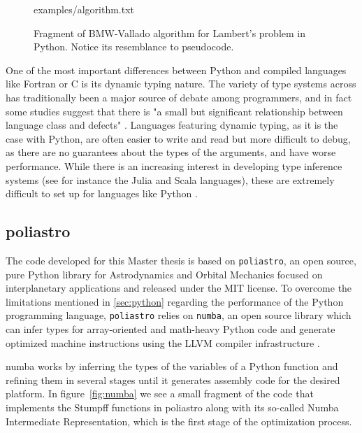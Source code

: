 \begin{figure}
\begin{lstinputlisting}[language=Python]{examples/algorithm.txt}
\end{lstinputlisting}
\caption{Fragment of BMW-Vallado algorithm for Lambert's problem in Python. Notice its resemblance to pseudocode.}
\label{fig:python}
\end{figure}

One of the most important differences between Python and compiled languages like Fortran or C is its dynamic typing nature. The variety of type systems across has traditionally been a major source of debate among programmers, and in fact some studies suggest that there is "a small but significant relationship between language class and defects" \cite{ray2014quality}. Languages featuring dynamic typing, as it is the case with Python, are often easier to write and read but more difficult to debug, as there are no guarantees about the types of the arguments, and have worse performance. While there is an increasing interest in developing type inference systems (see for instance the Julia and Scala languages), these are extremely difficult to set up for languages like Python \cite{cannon2005localized}.

\subsection{poliastro}

The code developed for this Master thesis is based on \verb|poliastro|, an open source, pure Python library for Astrodynamics and Orbital Mechanics focused on interplanetary applications and released under the MIT license\cite{cano2017poliastro060}. To overcome the limitations mentioned in \ref{sec:python} regarding the performance of the Python programming language, \verb|poliastro| relies on \verb|numba|, an open source library which can infer types for array-oriented and math-heavy Python code and generate optimized machine instructions using the LLVM compiler infrastructure \cite{numba}.

numba works by inferring the types of the variables of a Python function and refining them in several stages until it generates assembly code for the desired platform. In figure~\ref{fig:numba} we see a small fragment of the code that implements the Stumpff functions in poliastro along with its so-called Numba Intermediate Representation, which is the first stage of the optimization process.

